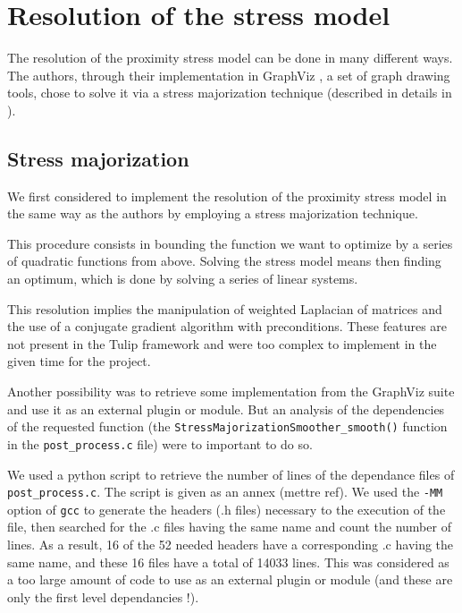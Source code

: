 \documentclass[12pt]{report}
\begin{document}
\section{Resolution of the stress model}

The resolution of the proximity stress model can be done in many different ways. The authors, through their implementation in GraphViz \cite{Gansner02}, a set of graph drawing tools, chose to solve it via a stress majorization technique (described in details in \cite{Gansner05}). 

\subsection{Stress majorization}

We first considered to implement the resolution of the proximity stress model in the same way as the authors by employing a stress majorization technique.

This procedure consists in bounding the function we want to optimize by a series of quadratic functions from above. Solving the stress model means then finding an optimum, which is done by solving a series of linear systems.

\bigskip
This resolution implies the manipulation of weighted Laplacian of matrices and the use of a conjugate gradient algorithm with preconditions. These features are not present in the Tulip framework and were too complex to implement in the given time for the project. 

\bigskip
Another possibility was to retrieve some implementation from the GraphViz suite and use it as an external plugin or module. 
But an analysis of the dependencies of the requested function (the \texttt{StressMajorizationSmoother\_smooth()} function in the \texttt{post\_process.c} file) were to important to do so.

We used a python script to retrieve the number of lines of the dependance files of \texttt{post\_process.c}. The script is given as an annex (mettre ref). We used the \texttt{-MM} option of \texttt{gcc} to generate the headers (.h files) necessary to the execution of the file, then searched for the .c files having the same name and count the number of lines. As a result, 16 of the 52 needed headers have a corresponding .c having the same name, and these 16 files have a total of 14033 lines.
This was considered as a too large amount of code to use as an external plugin or module (and these are only the first level dependancies !).
\end{document}
